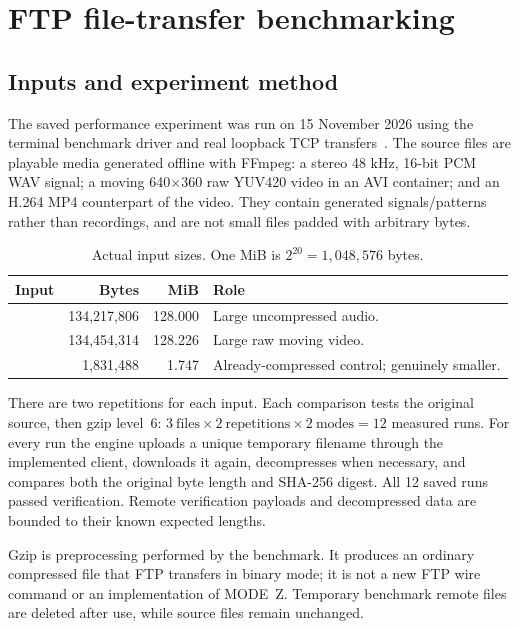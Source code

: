 \section{FTP file-transfer benchmarking}\label{sec:ftp-benchmark}

\subsection{Inputs and experiment method}
The saved performance experiment was run on 15 November 2026 using the terminal benchmark driver and real loopback TCP transfers~\cite{ftpmeasure}. The source files are playable media generated offline with FFmpeg: a stereo 48 kHz, 16-bit PCM WAV signal; a moving 640$\times$360 raw YUV420 video in an AVI container; and an H.264 MP4 counterpart of the video. They contain generated signals/patterns rather than recordings, and are not small files padded with arbitrary bytes.

\begin{table}[htbp]
\centering\small
\caption{Actual input sizes. One MiB is $2^{20}=1,048,576$ bytes.}
\begin{tabularx}{\linewidth}{@{}l r r Y@{}}
\toprule
Input & Bytes & MiB & Role \\
\midrule
{} & 134,217,806 & 128.000 & Large uncompressed audio. \\
 & 134,454,314 & 128.226 & Large raw moving video. \\
 & 1,831,488 & 1.747 & Already-compressed control; genuinely smaller. \\
\bottomrule
\end{tabularx}
\end{table}

There are two repetitions for each input. Each comparison tests the original source, then gzip level~6: $3\ \text{files}\times2\ \text{repetitions}\times2\ \text{modes}=12$ measured runs. For every run the engine uploads a unique temporary filename through the implemented client, downloads it again, decompresses when necessary, and compares both the original byte length and SHA-256 digest. All 12 saved runs passed verification. Remote verification payloads and decompressed data are bounded to their known expected lengths.

Gzip is preprocessing performed by the benchmark. It produces an ordinary compressed file that FTP transfers in binary mode; it is not a new FTP wire command or an implementation of MODE~Z. Temporary benchmark remote files are deleted after use, while source files remain unchanged.

